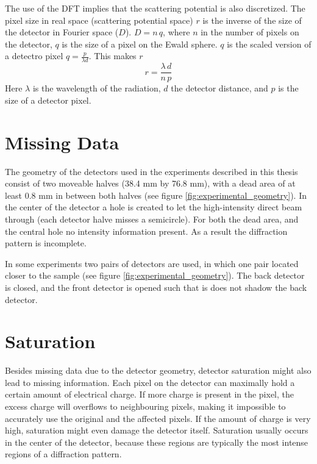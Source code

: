 The use of the DFT implies that the scattering potential is also discretized. The pixel size in real space (scattering potential space) $r$ is the inverse of the size of the detector in Fourier space ($D$). $D = n\,q$, where $n$ in the number of pixels on the detector, $q$ is the size of a pixel on the Ewald sphere. $q$ is the scaled version of a detectro pixel $q = \frac{p}{\lambda d}$. This makes $r$
\begin{equation}
r = \frac{\lambda\,d}{n\,p}
\end{equation}
Here $\lambda$ is the wavelength of the radiation, $d$ the detector distance, and $p$ is the size of a detector pixel.


\section{Missing Data}
The geometry of the detectors used in the experiments described in this thesis consist of two moveable halves (38.4 mm by 76.8 mm), with a dead area of at least 0.8 mm in between both halves (see figure \ref{fig:experimental_geometry}). In the center of the
detector a hole is created to let the high-intensity direct beam through (each detector halve misses a semicircle). For both the dead area, and the central hole no intensity information present. As a result the diffraction pattern is incomplete. 

In some experiments two pairs of detectors are used, in which one pair located closer to the sample (see figure \ref{fig:experimental_geometry}). The back detector is closed, and the front detector is opened such that is does not shadow the back detector.
 
\section{Saturation}
Besides missing data due to the detector geometry, detector saturation might also lead to missing information. Each pixel on the detector can maximally hold a certain amount of electrical charge. If more charge is present in the pixel, the excess charge will overflows to neighbouring pixels, making it impossible to accurately use the original and the
affected pixels. If the amount of charge is very high, saturation might even damage the detector itself. Saturation usually occurs in the center of the detector, because these regions are typically the most intense regions of a diffraction pattern. 




